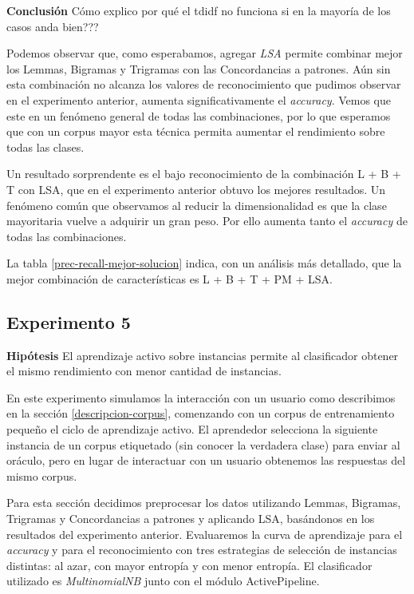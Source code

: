 \vspace{3 mm}

\textbf{Conclusión}
Cómo explico por qué el tdidf no funciona si en la mayoría de los casos anda bien???

Podemos observar que, como esperabamos, agregar \textit{LSA} permite combinar mejor los Lemmas, Bigramas y Trigramas con las Concordancias a patrones. Aún sin esta combinación no alcanza los valores de reconocimiento que pudimos observar en el experimento anterior, aumenta significativamente el \textit{accuracy}. Vemos que este en un fenómeno general de todas las combinaciones, por lo que esperamos que con un corpus mayor esta técnica permita aumentar el rendimiento sobre todas las clases.

Un resultado sorprendente es el bajo reconocimiento de la combinación L + B + T con LSA, que en el experimento anterior obtuvo los mejores resultados. Un fenómeno común que observamos al reducir la dimensionalidad es que la clase mayoritaria vuelve a adquirir un gran peso. Por ello aumenta tanto el \textit{accuracy} de todas las combinaciones.

La tabla \ref{prec-recall-mejor-solucion} indica, con un análisis más detallado, que la mejor combinación de características es L + B + T + PM + LSA.

\subsection{Experimento 5}
\vspace{3 mm}
\textbf{Hipótesis} El aprendizaje activo sobre instancias permite al clasificador obtener el mismo rendimiento con menor cantidad de instancias.
\vspace{3 mm}

En este experimento simulamos la interacción con un usuario como describimos en la sección \ref{descripcion-corpus}, comenzando con un corpus de entrenamiento pequeño el ciclo de aprendizaje activo. El aprendedor selecciona la siguiente instancia de un corpus etiquetado (sin conocer la verdadera clase) para enviar al oráculo, pero en lugar de interactuar con un usuario obtenemos las respuestas del mismo corpus.

Para esta sección decidimos preprocesar los datos utilizando Lemmas, Bigramas, Trigramas y Concordancias a patrones y aplicando LSA, basándonos en los resultados del experimento anterior. Evaluaremos la curva de aprendizaje para el \textit{accuracy} y para el reconocimiento con tres estrategias de selección de instancias distintas: al azar, con mayor entropía y con menor entropía. El clasificador utilizado es \textit{MultinomialNB} junto con el módulo ActivePipeline.

